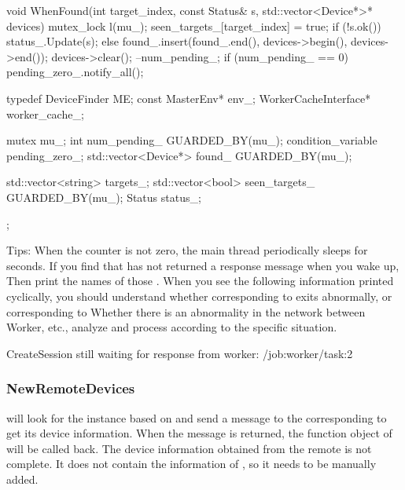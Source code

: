 \begin{content}
\begin{leftbar}
\begin{c++}
{  void WhenFound(int target_index, const Status& s,
                 std::vector<Device*>* devices) {
    mutex_lock l(mu_);
    seen_targets_[target_index] = true;
    if (!s.ok()) {
      status_.Update(s);
    } else {
      found_.insert(found_.end(), devices->begin(), devices->end());
      devices->clear();
    }
    --num_pending_;
    if (num_pending_ == 0) {
      pending_zero_.notify_all();
    }
  }

  typedef DeviceFinder ME;
  const MasterEnv* env_;
  WorkerCacheInterface* worker_cache_;

  mutex mu_;
  int num_pending_ GUARDED_BY(mu_);
  condition_variable pending_zero_;
  std::vector<Device*> found_ GUARDED_BY(mu_);

  std::vector<string> targets_;
  std::vector<bool> seen_targets_ GUARDED_BY(mu_);
  Status status_;
};
\end{c++}
\end{leftbar}

Tips: When the  counter is not zero, the main thread periodically sleeps for  seconds. If you find that  has not returned a response message when you wake up, Then print the names of those . When you see the following information printed cyclically, you should understand whether  corresponding to  exits abnormally, or \ascii corresponding to  Whether there is an abnormality in the network between {Worker}, etc., analyze and process according to the specific situation.

\begin{leftbar}
\begin{python}
CreateSession still waiting for response from worker: /job:worker/task:2
\end{python}
\end{leftbar}


\subsubsection{NewRemoteDevices}
 will look for the  instance based on  and send a  message to the corresponding  to get its device information. When the message is returned, the function object of  will be called back. The device information obtained from the remote  is not complete. It does not contain the information of , so it needs to be manually added.


\end{content}
